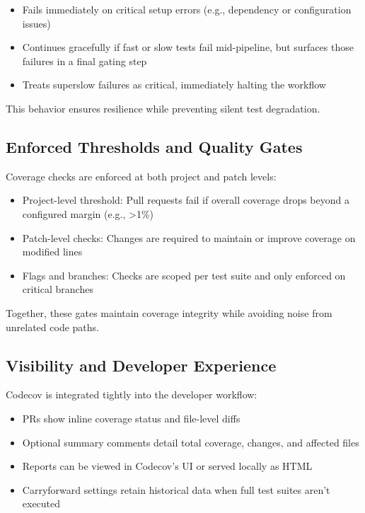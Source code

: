 \documentclass{article}
\begin{document}
\begin{itemize}

  \item Fails immediately on critical setup errors (e.g., dependency or
    configuration issues)

  \item Continues gracefully if fast or slow tests fail mid-pipeline, but
    surfaces those failures in a final gating step

  \item Treats superslow failures as critical, immediately halting the workflow
\end{itemize}

This behavior ensures resilience while preventing silent test degradation.

\subsection{Enforced Thresholds and Quality Gates}

Coverage checks are enforced at both project and patch levels:

\begin{itemize}

  \item Project-level threshold: Pull requests fail if overall coverage drops
    beyond a configured margin (e.g., \textgreater1\%)

  \item Patch-level checks: Changes are required to maintain or improve coverage
    on modified lines

  \item Flags and branches: Checks are scoped per test suite and only enforced
    on critical branches
\end{itemize}

Together, these gates maintain coverage integrity while avoiding noise from
unrelated code paths.

\subsection{Visibility and Developer Experience}

Codecov is integrated tightly into the developer workflow:

\begin{itemize}

  \item PRs show inline coverage status and file-level diffs

  \item Optional summary comments detail total coverage, changes, and affected files

  \item Reports can be viewed in Codecov's UI or served locally as HTML

  \item Carryforward settings retain historical data when full test suites aren't
    executed
\end{itemize}
\end{document}
